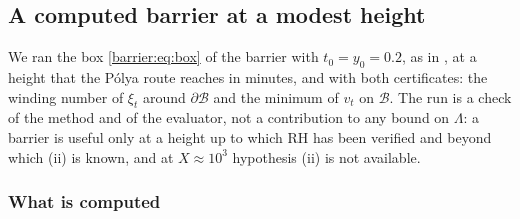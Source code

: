 \subsection{A computed barrier at a modest height}\label{barrier:sec:check}

We ran the box \eqref{barrier:eq:box} of the barrier with $t_0=y_0=0.2$, as in \cite{Polymath}, at a height that the P\'olya route reaches in minutes, and with both certificates: the winding number of $\xi_t$ around $\partial\mathcal B$ and the minimum of $v_t$ on $\mathcal B$. The run is a check of the method and of the evaluator, not a contribution to any bound on $\Lambda$: a barrier is useful only at a height up to which RH has been verified and beyond which (ii) is known, and at $X\approx10^3$ hypothesis (ii) is not available.

\subsubsection{What is computed}

